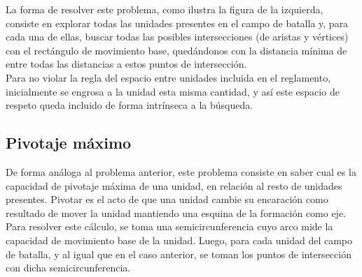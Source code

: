 \documentclass[a4paper,11pt]{article} %
\begin{document}
\begin{minipage}[h]{0.4\columnwidth}
\centering
{}
\end{minipage}
\begin{minipage}[h]{0.45\columnwidth}
La forma de resolver este problema, como ilustra la figura de la
izquierda, consiste en explorar todas las unidades presentes en el
campo de batalla y, para cada una de ellas, buscar todas las posibles
intersecciones (de aristas y vértices) con el rectángulo de movimiento
base, quedándonos con la distancia mínima de entre todas las distancias a
estos puntos de intersección.\\

\noindent
Para no violar la regla del espacio entre unidades incluida en el
reglamento, inicialmente se engrosa a la unidad esta misma cantidad, y
así este espacio de respeto queda incluido de forma intrínseca a la búsqueda.
\end{minipage}

\subsection{Pivotaje máximo}
\noindent
De forma análoga al problema anterior, este problema consiste en saber
cual es la capacidad de pivotaje máxima de una unidad, en relación al
resto de unidades presentes. Pivotar es el acto de que una unidad
cambie su encaración como resultado de mover la unidad mantiendo una
esquina de la formación como eje.\\

\noindent
Para resolver este cálculo, se toma una semicircunferencia cuyo arco
mide la capacidad de movimiento base de la unidad. Luego, para cada
unidad del campo de batalla, y al igual que en el caso anterior, se toman los
puntos de intersección con dicha semicircunferencia.\\
\end{document}
